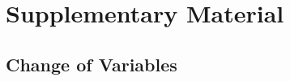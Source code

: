 \documentclass[12pt,a4paper]{report}
\begin{document}









\printbibliography[heading=bibintoc,title={Bibliography}]

\appendix

\chapter{Supplementary Material}
\label{chap:supplementary_material}

\section{Change of Variables}
\label{sec:change_of_variables}
\end{document}
